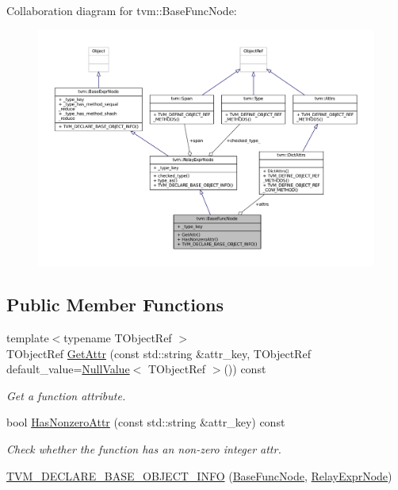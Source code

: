 Collaboration diagram for tvm\+:\+:Base\+Func\+Node\+:
\nopagebreak
\begin{figure}[H]
\begin{center}
\leavevmode
\includegraphics[width=350pt]{classtvm_1_1BaseFuncNode__coll__graph}
\end{center}
\end{figure}
\subsection*{Public Member Functions}
\begin{DoxyCompactItemize}
\item 
{\footnotesize template$<$typename T\+Object\+Ref $>$ }\\T\+Object\+Ref \hyperlink{classtvm_1_1BaseFuncNode_a6f177158609cf9da9a4e0a9d3187e3d2}{Get\+Attr} (const std\+::string \&attr\+\_\+key, T\+Object\+Ref default\+\_\+value=\hyperlink{namespacetvm_ab6c242e8ac09beb463fba306948b7f15}{Null\+Value}$<$ T\+Object\+Ref $>$()) const 
\begin{DoxyCompactList}\small\item\em Get a function attribute. \end{DoxyCompactList}\item 
bool \hyperlink{classtvm_1_1BaseFuncNode_a11694119d77e8d04a9fffd5e9a8b0766}{Has\+Nonzero\+Attr} (const std\+::string \&attr\+\_\+key) const 
\begin{DoxyCompactList}\small\item\em Check whether the function has an non-\/zero integer attr. \end{DoxyCompactList}\item 
\hyperlink{classtvm_1_1BaseFuncNode_a577e46c2eda9aec1f8a8e48444d00fd2}{T\+V\+M\+\_\+\+D\+E\+C\+L\+A\+R\+E\+\_\+\+B\+A\+S\+E\+\_\+\+O\+B\+J\+E\+C\+T\+\_\+\+I\+N\+FO} (\hyperlink{classtvm_1_1BaseFuncNode}{Base\+Func\+Node}, \hyperlink{classtvm_1_1RelayExprNode}{Relay\+Expr\+Node})
\end{DoxyCompactItemize}
